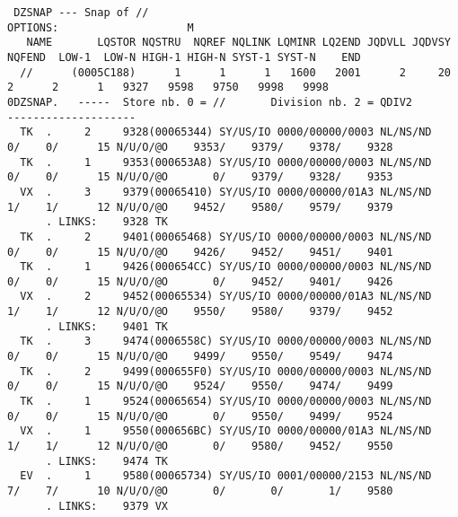 \begin{Listing}\begin{verbatim}
 DZSNAP --- Snap of //                                                                             OPTIONS:                    M
   NAME       LQSTOR NQSTRU  NQREF NQLINK LQMINR LQ2END JQDVLL JQDVSY NQFEND  LOW-1  LOW-N HIGH-1 HIGH-N SYST-1 SYST-N    END
  //      (0005C188)      1      1      1   1600   2001      2     20      2      2      1   9327   9598   9750   9998   9998
0DZSNAP.   -----  Store nb. 0 = //       Division nb. 2 = QDIV2                       --------------------
  TK  .     2     9328(00065344) SY/US/IO 0000/00000/0003 NL/NS/ND    0/    0/      15 N/U/O/@O    9353/    9379/    9378/    9328
  TK  .     1     9353(000653A8) SY/US/IO 0000/00000/0003 NL/NS/ND    0/    0/      15 N/U/O/@O       0/    9379/    9328/    9353
  VX  .     3     9379(00065410) SY/US/IO 0000/00000/01A3 NL/NS/ND    1/    1/      12 N/U/O/@O    9452/    9580/    9579/    9379
      . LINKS:    9328 TK
  TK  .     2     9401(00065468) SY/US/IO 0000/00000/0003 NL/NS/ND    0/    0/      15 N/U/O/@O    9426/    9452/    9451/    9401
  TK  .     1     9426(000654CC) SY/US/IO 0000/00000/0003 NL/NS/ND    0/    0/      15 N/U/O/@O       0/    9452/    9401/    9426
  VX  .     2     9452(00065534) SY/US/IO 0000/00000/01A3 NL/NS/ND    1/    1/      12 N/U/O/@O    9550/    9580/    9379/    9452
      . LINKS:    9401 TK
  TK  .     3     9474(0006558C) SY/US/IO 0000/00000/0003 NL/NS/ND    0/    0/      15 N/U/O/@O    9499/    9550/    9549/    9474
  TK  .     2     9499(000655F0) SY/US/IO 0000/00000/0003 NL/NS/ND    0/    0/      15 N/U/O/@O    9524/    9550/    9474/    9499
  TK  .     1     9524(00065654) SY/US/IO 0000/00000/0003 NL/NS/ND    0/    0/      15 N/U/O/@O       0/    9550/    9499/    9524
  VX  .     1     9550(000656BC) SY/US/IO 0000/00000/01A3 NL/NS/ND    1/    1/      12 N/U/O/@O       0/    9580/    9452/    9550
      . LINKS:    9474 TK
  EV  .     1     9580(00065734) SY/US/IO 0001/00000/2153 NL/NS/ND    7/    7/      10 N/U/O/@O       0/       0/       1/    9580
      . LINKS:    9379 VX
\end{verbatim}\end{Listing}
